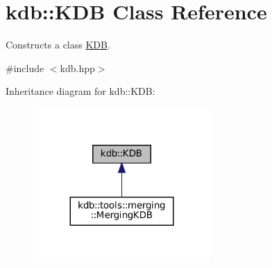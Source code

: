 \hypertarget{classkdb_1_1KDB}{}\section{kdb\+::K\+DB Class Reference}
\label{classkdb_1_1KDB}


Constructs a class \mbox{\hyperlink{classkdb_1_1KDB}{K\+DB}}.  




{\ttfamily \#include $<$kdb.\+hpp$>$}



Inheritance diagram for kdb\+::K\+DB\+:
\nopagebreak
\begin{figure}[H]
\begin{center}
\leavevmode
\includegraphics[width=191pt]{classkdb_1_1KDB__inherit__graph}
\end{center}
\end{figure}
